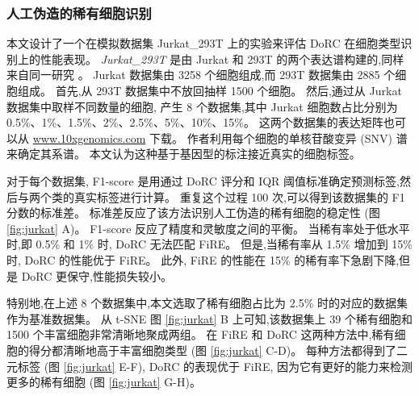 \subsubsection{人工伪造的稀有细胞识别}
\label{subsec:recplanted} 


本文设计了一个在模拟数据集 Jurkat\_293T 上的实验来评估 DoRC 在细胞类型识别上的性能表现。
 \textit{Jurkat\_293T} 是由 Jurkat 和 293T 的两个表达谱构建的,同样来自同一研究 。
Jurkat 数据集由 3258 个细胞组成,而 293T 数据集由 2885 个细胞组成。
首先,从 293T 数据集中不放回抽样 1500 个细胞。
然后,通过从 Jurkat 数据集中取样不同数量的细胞,
产生 8 个数据集,其中 Jurkat 细胞数占比分别为 0.5\%、1\%、1.5\%、2\%、2.5\%、5\%、10\%、15\%。
这两个数据集的表达矩阵也可以从 \url{www.10xgenomics.com} 下载。
作者利用每个细胞的单核苷酸变异 (SNV) 谱来确定其系谱。
本文认为这种基于基因型的标注接近真实的细胞标签。

对于每个数据集, F1-score 是用通过 DoRC 评分和 IQR 阈值标准确定预测标签,然后与两个类的真实标签进行计算。
重复这个过程 100 次,可以得到该数据集的 F1 分数的标准差。
标准差反应了该方法识别人工伪造的稀有细胞的稳定性 (图 \ref{fig:jurkat} A)。 
F1-score 反应了精度和灵敏度之间的平衡。
当稀有率处于低水平时,即 0.5\% 和 1\% 时, DoRC 无法匹配 FiRE。
但是,当稀有率从 1.5\% 增加到 15\% 时, DoRC 的性能优于 FiRE。
此外, FiRE 的性能在 15\% 的稀有率下急剧下降,但是 DoRC 更保守,性能损失较小。

特别地,在上述 8 个数据集中,本文选取了稀有细胞占比为 2.5\% 时的对应的数据集作为基准数据集。
从 t-SNE 图 \ref{fig:jurkat} B 上可知,该数据集上 39 个稀有细胞和 1500 个丰富细胞非常清晰地聚成两组。
在 FiRE 和 DoRC 这两种方法中,稀有细胞的得分都清晰地高于丰富细胞类型 (图 \ref{fig:jurkat} C-D)。
每种方法都得到了二元标签 (图 \ref{fig:jurkat} E-F), DoRC 的表现优于 FiRE,
因为它有更好的能力来检测更多的稀有细胞 (图 \ref{fig:jurkat} G-H)。


